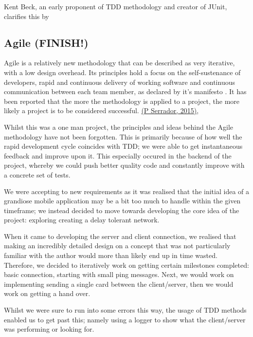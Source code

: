 \documentclass[11pt]{article}
\begin{document}
Kent Beck, an early proponent of TDD methodology and creator of JUnit, clarifies this by 


\subsection{Agile (FINISH!)}

Agile is a relatively new methodology that can be described as very iterative, with a low design overhead. Its principles hold a focus on the self-sustenance of developers, rapid and continuous delivery of working software and continuous communication between each team member, as declared by it's manifesto \cite{agile_manifesto}. It has been reported that the more the methodology is applied to a project, the more likely a project is to be considered successful. \hyperlink{agile_success}{(P Serrador, 2015)}, 

Whilst this was a one man project, the principles and ideas behind the Agile methodology have not been forgotten. This is primarily because of how well the rapid development cycle coincides with TDD; we were able to get instantaneous feedback and improve upon it. This especially occured in the backend of the project, whereby we could push better quality code and constantly improve with a concrete set of tests.

We were accepting to new requirements as it was realised that the initial idea of a grandiose mobile application may be a bit too much to handle within the given timeframe; we instead decided to move towards developing the core idea of the project: exploring creating a delay tolerant network.

When it came to developing the server and client connection, we realised that making an incredibly detailed design on a concept that was not particularly familiar with the author would more than likely end up in time wasted. Therefore, we decided to iteratively work on getting certain milestones completed: basic connection, starting with small ping messages. Next, we would work on implementing sending a single card between the client/server, then we would work on getting a hand over. 

Whilst we were sure to run into some errors this way, the usage of TDD methods enabled us to get past this; namely using a logger to show what the client/server was performing or looking for.



\end{document}
